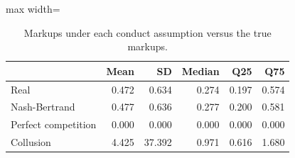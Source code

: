 \begin{table}[H]
\centering\small
\caption{Markups under each conduct assumption versus the true markups.}\label{tab:q9e_markup}
\begin{adjustbox}{max width=\linewidth}
\begin{tabular}{lrrrrr}
\toprule
 & Mean & SD & Median & Q25 & Q75 \\
\midrule
Real & 0.472 & 0.634 & 0.274 & 0.197 & 0.574 \\
Nash-Bertrand & 0.477 & 0.636 & 0.277 & 0.200 & 0.581 \\
Perfect competition & 0.000 & 0.000 & 0.000 & 0.000 & 0.000 \\
Collusion & 4.425 & 37.392 & 0.971 & 0.616 & 1.680 \\
\bottomrule
\end{tabular}
\end{adjustbox}
\par\vspace{3pt}{\footnotesize Markup $(p-c)/p$ over the 300 product-market observations; implied markups use the cost recovered from the first-order condition under each conduct assumption.}
\end{table}
